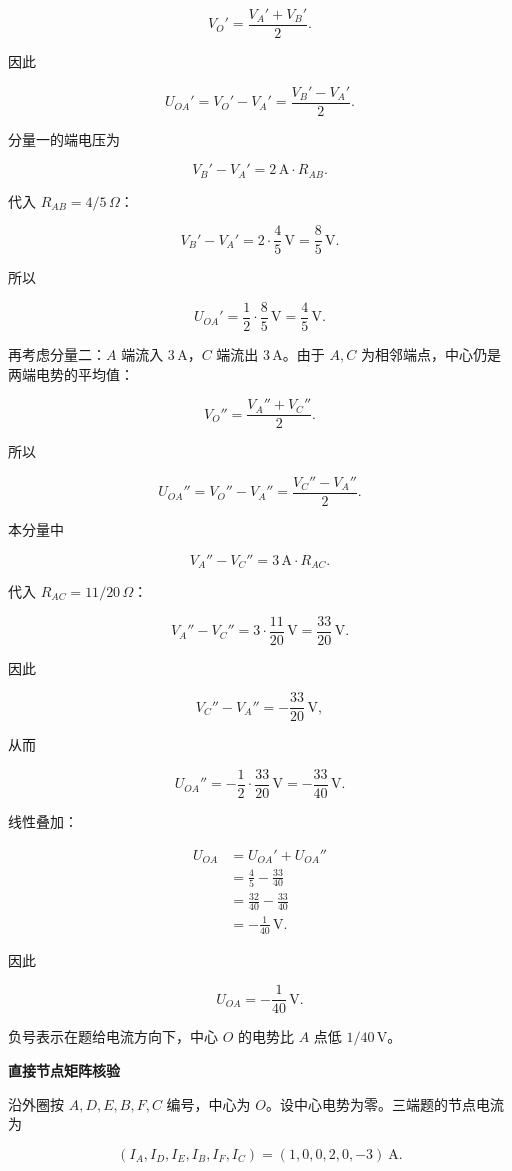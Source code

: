 \documentclass[12pt,a4paper,UTF8]{ctexart}
\begin{document}
\[V_O'=\frac{V_A'+V_B'}{2}.\]

因此

\[U_{OA}'=V_O'-V_A'
=\frac{V_B'-V_A'}{2}.\]

分量一的端电压为

\[V_B'-V_A'
=2\,\mathrm A\cdot R_{AB}.\]

代入 \(R_{AB}=4/5\,\Omega\)：

\[V_B'-V_A'
=2\cdot\frac45\,\mathrm V
=\frac85\,\mathrm V.\]

所以

\[U_{OA}'=\frac12\cdot\frac85\,\mathrm V
=\frac45\,\mathrm V.\]

再考虑分量二：\(A\) 端流入 \(3\,\mathrm A\)，\(C\) 端流出
\(3\,\mathrm A\)。由于 \(A,C\) 为相邻端点，中心仍是两端电势的平均值：

\[V_O''=\frac{V_A''+V_C''}{2}.\]

所以

\[U_{OA}''
=V_O''-V_A''
=\frac{V_C''-V_A''}{2}.\]

本分量中

\[V_A''-V_C''
=3\,\mathrm A\cdot R_{AC}.\]

代入 \(R_{AC}=11/20\,\Omega\)：

\[V_A''-V_C''
=3\cdot\frac{11}{20}\,\mathrm V
=\frac{33}{20}\,\mathrm V.\]

因此

\[V_C''-V_A''=-\frac{33}{20}\,\mathrm V,\]

从而

\[U_{OA}''
=-\frac12\cdot\frac{33}{20}\,\mathrm V
=-\frac{33}{40}\,\mathrm V.\]

线性叠加：

\[\begin{aligned}
U_{OA}
&=U_{OA}'+U_{OA}''\\
&=\frac45-\frac{33}{40}\\
&=\frac{32}{40}-\frac{33}{40}\\
&=-\frac1{40}\,\mathrm V.
\end{aligned}\]

因此

\[\boxed{U_{OA}=-\frac1{40}\,\mathrm V}.\]

负号表示在题给电流方向下，中心 \(O\) 的电势比 \(A\) 点低
\(1/40\,\mathrm V\)。

\textbf{直接节点矩阵核验}

沿外圈按 \(A,D,E,B,F,C\) 编号，中心为
\(O\)。设中心电势为零。三端题的节点电流为

\[(I_A,I_D,I_E,I_B,I_F,I_C)=(1,0,0,2,0,-3)\ \mathrm A.\]
\end{document}
